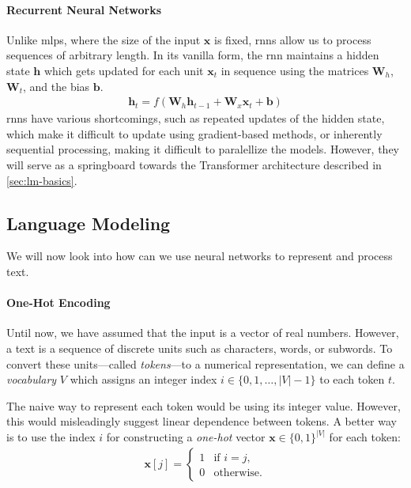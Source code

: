 \paragraph{Recurrent Neural Networks} Unlike \acp{mlp}, where the size of the input $\mathbf{x}$ is fixed, \acp{rnn} allow us to process sequences of arbitrary length. In its vanilla form, the \ac{rnn} maintains a hidden state $\mathbf{h}$ which gets updated for each unit $\mathbf{x}_t$ in sequence using the matrices $\mathbf{W}_h$, $\mathbf{W}_t$, and the bias $\mathbf{b}$.
\begin{align}
    \mathbf{h}_t = f(\mathbf{W}_h \mathbf{h}_{t-1} + \mathbf{W}_x \mathbf{x}_t + \mathbf{b})
\end{align}
\acp{rnn} have various shortcomings, such as repeated updates of the hidden state, which make it difficult to update using gradient-based methods, or inherently sequential processing, making it difficult to paralellize the models. However, they will serve as a springboard towards the Transformer architecture described in \autoref{sec:lm-basics}.


\subsection{Language Modeling}
\label{sec:lm-basics}
We will now look into how can we use neural networks to represent and process text.


\paragraph{One-Hot Encoding} Until now, we have assumed that the input is a vector of real numbers. However, a text is a sequence of discrete units such as characters, words, or subwords. To convert these units---called \textit{tokens}---to a numerical representation, we can define a \textit{vocabulary} $V$ which assigns an integer index $i \in \{0, 1, \ldots, |V|-1\}$ to each token $t$.

The naive way to represent each token would be using its integer value. However, this would misleadingly suggest linear dependence between tokens. A better way is to use the index $i$ for constructing a \textit{one-hot} vector $\mathbf{x} \in \{0,1\}^{|V|} $ for each token:
\begin{align}
    \mathbf{x}[j] = \begin{cases}
        1 & \text{if } i = j, \\
        0 & \text{otherwise}.
    \end{cases}
\end{align}

